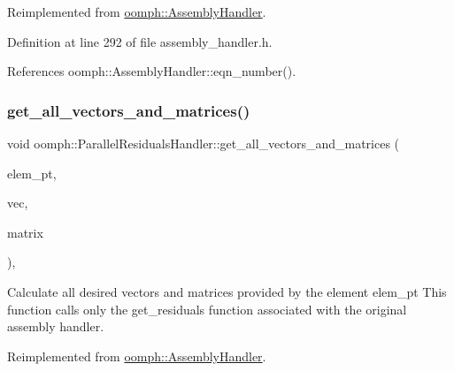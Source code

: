 Reimplemented from \hyperlink{classoomph_1_1AssemblyHandler_a94d28e2de2559cde803d1ba2195b5290}{oomph\+::\+Assembly\+Handler}.



Definition at line 292 of file assembly\+\_\+handler.\+h.



References oomph\+::\+Assembly\+Handler\+::eqn\+\_\+number().

\mbox{\label{classoomph_1_1ParallelResidualsHandler_adea071e3131e4e84b7c3e9400892fb17}} 
\subsubsection{\texorpdfstring{get\+\_\+all\+\_\+vectors\+\_\+and\+\_\+matrices()}{get\_all\_vectors\_and\_matrices()}}
{\footnotesize\ttfamily void oomph\+::\+Parallel\+Residuals\+Handler\+::get\+\_\+all\+\_\+vectors\+\_\+and\+\_\+matrices (\begin{DoxyParamCaption}\item[{\hyperlink{classoomph_1_1GeneralisedElement}{Generalised\+Element} $\ast$const \&}]{elem\+\_\+pt,  }\item[{\hyperlink{classoomph_1_1Vector}{Vector}$<$ \hyperlink{classoomph_1_1Vector}{Vector}$<$ double $>$ $>$ \&}]{vec,  }\item[{\hyperlink{classoomph_1_1Vector}{Vector}$<$ \hyperlink{classoomph_1_1DenseMatrix}{Dense\+Matrix}$<$ double $>$ $>$ \&}]{matrix }\end{DoxyParamCaption})\hspace{0.3cm}{\ttfamily [inline]}, {\ttfamily [virtual]}}



Calculate all desired vectors and matrices provided by the element elem\+\_\+pt This function calls only the get\+\_\+residuals function associated with the original assembly handler. 



Reimplemented from \hyperlink{classoomph_1_1AssemblyHandler_ab2e4ee4623116b18245ca90cfe9ba144}{oomph\+::\+Assembly\+Handler}.




